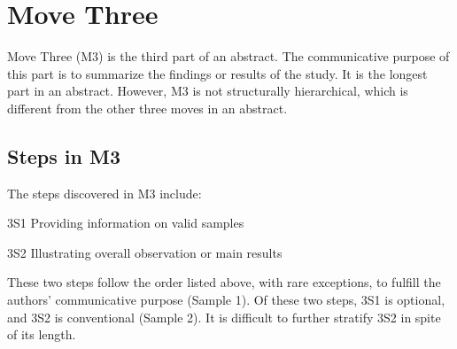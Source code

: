 \documentclass{ctexbook}
\begin{document}
\chapter{Move Three}\label{chapter5}

Move Three (M3) is the third part of an abstract. The communicative purpose of this part is to summarize the findings or results of the study. It is the longest part in an abstract. However, M3 is not structurally hierarchical, which is different from the other three moves in an abstract.

\section{Steps in M3}

The steps discovered in M3 include:

3S1 Providing information on valid samples

3S2 Illustrating overall observation or main results 

These two steps follow the order listed above, with rare exceptions, to fulfill the authors' communicative purpose (Sample 1). Of these two steps, 3S1 is optional, and 3S2 is conventional (Sample 2). It is difficult to further stratify 3S2 in spite of its length.
\end{document}

